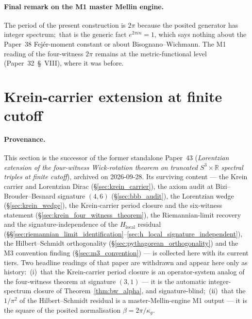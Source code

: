 \documentclass[11pt,a4paper]{article}
\theoremstyle{plain}
\theoremstyle{definition}
\newcommand{\sthree}{S^{3}}
\newcommand{\R}{\mathbb{R}}
\begin{document}
\paragraph{Final remark on the M1 master Mellin engine.}
The period of the present construction is $2\pi$
because the posited generator has integer spectrum;\ that is the
generic fact $e^{2\pi i n} = 1$, which says nothing about the
Paper~38 Fej\'er-moment constant or about Bisognano--Wichmann.  The M1 reading
of the four-witness $2\pi$ remains at the metric-functional level
(Paper~32~\S~VIII), where it was before.

\section{Krein-carrier extension at finite cutoff}
\label{sec:lorentzian_closure}

\paragraph{Provenance.}
This section is the successor of the former standalone Paper~43
(\emph{Lorentzian extension of the four-witness Wick-rotation theorem on
truncated $\sthree \times \R$ spectral triples at finite cutoff}),
archived on 2026-09-28.  Its surviving content --- the Krein carrier and
Lorentzian Dirac (\S\ref{sec:krein_carrier}), the axiom audit at
Bizi--Brouder--Besnard signature $(4, 6)$ (\S\ref{sec:bbb_audit}), the
Lorentzian wedge (\S\ref{sec:krein_wedge}), the Krein-carrier period
closure and the six-witness statement (\S\ref{sec:krein_four_witness_theorem}),
the Riemannian-limit recovery and the signature-independence of the
$H_{\mathrm{local}}$ residual
(\S\S\ref{sec:riemannian_limit_identification}--\ref{sec:h_local_signature_independent}),
the Hilbert--Schmidt orthogonality (\S\ref{sec:pythagorean_orthogonality})
and the M3 convention finding (\S\ref{sec:m3_convention}) --- is collected
here with its current tiers.  Two headline readings of that paper are
withdrawn and appear here only as history:\ (i)~that the Krein-carrier
period closure is an operator-system analog of the four-witness theorem
at signature $(3, 1)$ --- it is the automatic integer-spectrum closure of
Theorem~\ref{thm:bw_alpha}, and signature-blind;\ (ii)~that the $1/\pi^2$
of the Hilbert--Schmidt residual is a master-Mellin-engine M1 output ---
it is the square of the posited normalisation $\beta = 2\pi/\kappa_g$.
\end{document}
